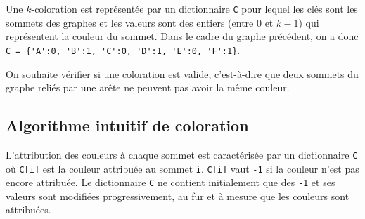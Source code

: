 

Une $k$-coloration est représentée par un dictionnaire \lstinline{C} pour lequel les clés sont les sommets des graphes et les valeurs sont des entiers (entre 0 et $k-1$) qui représentent la couleur du sommet.
Dans le cadre du graphe précédent, on a donc \lstinline|C = {'A':0, 'B':1, 'C':0, 'D':1, 'E':0, 'F':1}|.

On souhaite vérifier si une coloration est valide, c'est-à-dire que deux sommets du graphe reliés par une arête ne peuvent pas avoir la même couleur.





\subsection*{Algorithme intuitif de coloration}

L’attribution des couleurs à chaque sommet est caractérisée par un dictionnaire \lstinline{C} où \lstinline{C[i]} est la couleur attribuée au sommet \lstinline{i}. \lstinline{C[i]} vaut \lstinline{-1} si la couleur n’est pas encore attribuée. Le dictionnaire \lstinline{C} ne contient initialement que des \lstinline{-1} et ses valeurs sont modifiées progressivement, au fur et à mesure que les couleurs sont attribuées.



